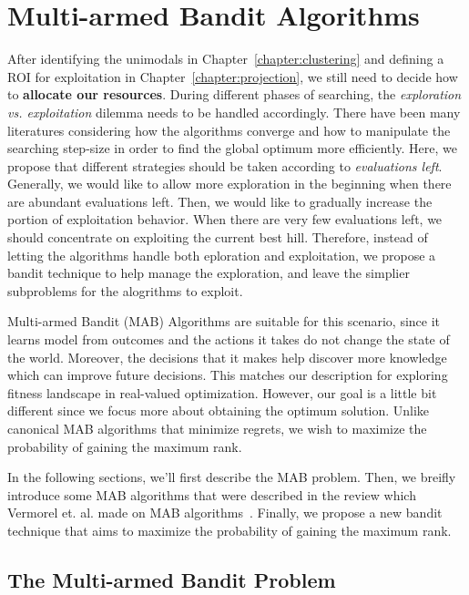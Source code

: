 \chapter{Multi-armed Bandit Algorithms}
\label{chapter:MAB}

After identifying the unimodals in Chapter~\ref{chapter:clustering} and defining a ROI for exploitation in Chapter~\ref{chapter:projection},
we still need to decide how to \textbf{allocate our resources}.
During different phases of searching, the \textit{exploration vs. exploitation} dilemma needs to be handled accordingly.
There have been many literatures considering how the algorithms converge 
and how to manipulate the searching step-size in order to find the global optimum more efficiently.
Here, we propose that different strategies should be taken according to \textit{evaluations left}.
Generally, we would like to allow more exploration in the beginning when there are abundant evaluations left.
Then, we would like to gradually increase the portion of exploitation behavior.
When there are very few evaluations left, we should concentrate on exploiting the current best hill.
Therefore, instead of letting the algorithms handle both eploration and exploitation, we propose a bandit technique to help manage the exploration, and leave the simplier subproblems for the alogrithms to exploit.

Multi-armed Bandit (MAB) Algorithms are suitable for this scenario, 
since it learns model from outcomes and the actions it takes do not change the state of the world.
Moreover, the decisions that it makes help discover more knowledge which can improve future decisions.
This matches our description for exploring fitness landscape in real-valued optimization.
However, our goal is a little bit different since we focus more about obtaining the optimum solution.
Unlike canonical MAB algorithms that minimize regrets, we wish to maximize the probability of gaining the maximum rank.

In the following sections, we'll first describe the MAB problem.
Then, we breifly introduce some MAB algorithms 
that were described in the review which Vermorel et. al. made on MAB algorithms~\cite{Vermorel:2005:MAB}.
Finally, we propose a new bandit technique that aims to maximize the probability of gaining the maximum rank.


\section{The Multi-armed Bandit Problem}

